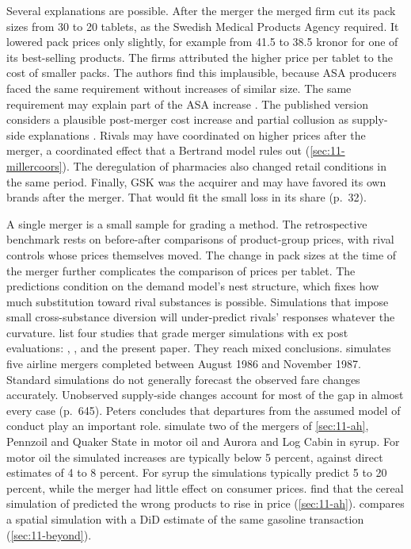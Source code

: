 Several explanations are possible. After the merger the merged firm cut its pack sizes from 30 to 20 tablets, as the
Swedish Medical Products Agency required. It lowered pack prices only slightly, for example from 41.5 to 38.5 kronor
for one of its best-selling products. The firms attributed the higher price per tablet to the cost of smaller packs. The authors
find this implausible, because ASA producers faced the same requirement without increases of similar size. The same
requirement may explain part of the ASA increase \citep[p.~29]{BjornerstedtVerboven2013}. The published version
considers a plausible post-merger cost increase and partial collusion as supply-side explanations
\citep[abstract]{BjornerstedtVerboven2016}. Rivals may have coordinated on higher prices after the merger, a
coordinated effect that a Bertrand model rules out (\cref{sec:11-millercoors}). The deregulation of pharmacies also
changed retail conditions in the same period. Finally, GSK was the acquirer and may have favored its own brands
after the merger. That would fit the small loss in its share (p.~32).

 A single merger is a small sample for grading a method. The
retrospective benchmark rests on before-after comparisons of product-group prices, with rival controls whose prices
themselves moved. The change in pack sizes at the time of the merger further complicates the comparison of prices per
tablet. The predictions condition on the demand model's nest structure, which fixes how much substitution toward
rival substances is possible. Simulations that impose small cross-substance diversion will under-predict rivals'
responses whatever the curvature. \citet[p.~231]{AskerNocke2021} list four studies that grade merger simulations
with ex post evaluations: \citet{Peters2006}, \citet{Weinberg2011}, \citet{WeinbergHosken2013} and the present paper.
They reach mixed conclusions. \citet[pp.~627--628]{Peters2006} simulates five airline mergers completed between
August 1986 and November 1987. Standard simulations do not generally forecast the observed fare changes accurately.
Unobserved supply-side changes account for most of the gap in almost every case (p.~645). Peters concludes that
departures from the assumed model of conduct play an important role. \citet[p.~1584]{WeinbergHosken2013} simulate
two of the mergers of \cref{sec:11-ah}, Pennzoil and Quaker State in motor oil and Aurora and Log Cabin in syrup. For
motor oil the simulated increases are typically below 5 percent, against direct estimates of 4 to 8 percent. For
syrup the simulations typically predict 5 to 20 percent, while the merger had little effect on consumer prices.
\citet{AshenfelterHosken2010} find that the cereal simulation of \citet{Nevo2000b} predicted the wrong products to
rise in price (\cref{sec:11-ah}). \citet{Houde2012} compares a spatial simulation with a DiD estimate of the same
gasoline transaction (\cref{sec:11-beyond}).

